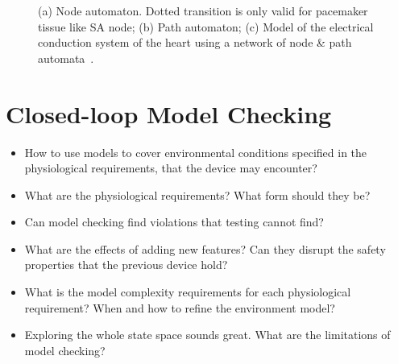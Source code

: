 \documentclass[openany]{now} %
\begin{document}
\begin{figure}[!t]
\centering
		
\caption{\small (a) Node automaton. Dotted transition is only valid for pacemaker tissue like SA node; (b) Path automaton; (c) Model of the electrical conduction system of the heart using a network of node \& path automata~\cite{vhm_ecrts10}.}
\end{figure} 


\chapter{Closed-loop Model Checking}
\begin{itemize}
	\item How to use models to cover environmental conditions specified in the physiological requirements, that the device may encounter?
            \item What are the physiological requirements? What form should they be?
            \item Can model checking find violations that testing cannot find?
            \item What are the effects of adding new features? Can they disrupt the safety properties that the previous device hold?
            \item What is the model complexity requirements for each physiological requirement? When and how to refine the environment model?
            \item Exploring the whole state space sounds great. What are the limitations of model checking? 
\end{itemize}
\end{document}
